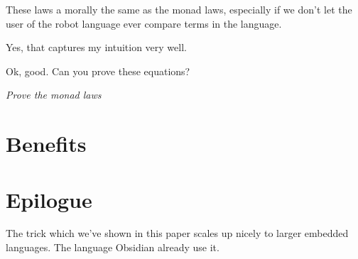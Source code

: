 \begin{dialogue}

\speak{\docname{}} These laws a morally the same as the monad
laws, especially if we don't let the user of the robot language ever
compare terms in the language.

\speak{\studname{}} Yes, that captures my intuition very well.

\speak{\docname{}} Ok, good. Can you prove these equations?
\end{dialogue}

\emph{Prove the monad laws}\newline \newline 



\section{Benefits} 

\section{Epilogue}

The trick which we've shown in this paper scales up nicely to larger
embedded languages. The language Obsidian already use it.


